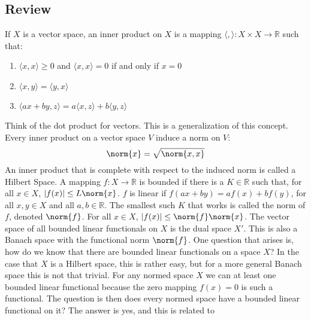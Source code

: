         \subsection{Review}
            If $X$ is a vector space, an inner product on
            $X$ is a mapping
            $\langle,\rangle:X\times{X}\rightarrow\mathbb{R}$
            such that:
            \begin{enumerate}
                \item $\langle{x,x}\rangle\geq{0}$ and
                      $\langle{x,x}\rangle=0$ if and only if
                      $x=0$
                \item $\langle{x,y}\rangle=\langle{y,x}\rangle$
                \item $\langle{ax+by,z}\rangle%
                       =a\langle{x,z}\rangle+b\langle{y,z}\rangle$
            \end{enumerate}
            Think of the dot product for vectors. This is a
            generalization of this concept. Every inner product
            on a vector space $V$ induce a norm on $V$:
            \begin{equation*}
                \norm{x}=\sqrt{\norm{x,x}}
            \end{equation*}
            An inner product that is complete with respect to
            the induced norm is called a Hilbert Space. A mapping
            $f:X\rightarrow\mathbb{R}$ is bounded if there is a
            $K\in\mathbb{R}$ such that, for all $x\in{X}$,
            $|f(x)|\leq{L\norm{x}}$. $f$ is linear if
            $f(ax+by)=af(x)+bf(y)$, for all $x,y\in{X}$ and all
            $a,b\in\mathbb{R}$. The smallest such $K$ that works
            is called the norm of $f$, denoted $\norm{f}$. For
            all $x\in{X}$, $|f(x)|\leq\norm{f}\norm{x}$. The
            vector space of all bounded linear functionals on
            $X$ is the dual space $X'$. This is also a Banach
            space with the functional norm $\norm{f}$. One
            question that arises is, how do we know that there
            are bounded linear functionals on a space $X$? In
            the case that $X$ is a Hilbert space, this is rather
            easy, but for a more general Banach space this is not
            that trivial. For any normed space $X$ we can at least
            one bounded linear functional because the zero mapping
            $f(x)=0$ is such a functional. The question is then
            does every normed space have a bounded linear functional
            on it? The answer is yes, and this is related to

